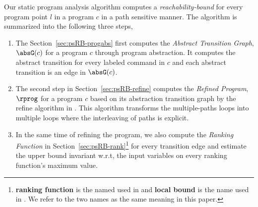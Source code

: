 Our static program analysis algorithm computes 
a \emph{reachability-bound} for every program point $l$ in a program $c$ in a path sensitive manner.
The algorithm is summarized into the following three steps,
\begin{enumerate}
\item  The Section~\ref{sec:psRB-progabs} first 
computes the \emph{Abstract Transition Graph}, $\absG(c)$ for a program $c$ through program abstraction.
It computes the abstract transition 
for every labeled command in $c$ and each abstract transition is an edge in $\absG(c)$.
\item The second step in Section~\ref{sec:psRB-refine}
computes the \emph{Refined Program}, $\rprog$ for a program $c$ based on 
its abstraction transition graph by the refine algorithm in \cite{GulwaniJK09}.
This algorithm transforms the multiple-paths loops
into multiple loops where
the interleaving of paths is explicit.
\item In the same time of refining the program, we also compute the \emph{Ranking Function} in Section~\ref{sec:psRB-rank}\footnote{\textbf{ranking function} is the named used in \cite{SinnZV14}
and \textbf{local bound} is the name used in \cite{ZulegerGSV11, SinnZV17}.
We refer to the two names as the same meaning in this paper.}  for every transition edge 
and estimate the upper bound invariant w.r.t, the input variables on every ranking function's maximum value.


\end{enumerate}
